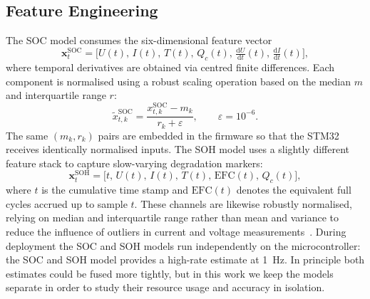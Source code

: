\documentclass[final,3p,times]{elsarticle}
\begin{document}
\subsection{Feature Engineering}
The SOC model consumes the six-dimensional feature vector
\begin{equation}
    \mathbf{x}^{\mathrm{SOC}}_t = \bigl[U(t),\, I(t),\, T(t),\, Q_c(t),\, \tfrac{\mathrm{d}U}{\mathrm{d}t}(t),\, \tfrac{\mathrm{d}I}{\mathrm{d}t}(t)\bigr],
\end{equation}
where temporal derivatives are obtained via centred finite differences. Each component is normalised using a robust scaling operation based on the median $m$ and interquartile range $r$: 
\begin{equation}
    \tilde{x}^{\mathrm{SOC}}_{t,k} = \frac{x^{\mathrm{SOC}}_{t,k} - m_k}{r_k + \varepsilon}, \qquad \varepsilon=10^{-6}.
\end{equation}
The same $(m_k,r_k)$ pairs are embedded in the firmware so that the STM32 receives identically normalised inputs. 
The SOH model uses a slightly different feature stack to capture slow-varying degradation markers:
\begin{equation}
    \mathbf{x}^{\mathrm{SOH}}_t = \bigl[ t,\, U(t),\, I(t),\, T(t),\, \mathrm{EFC}(t),\, Q_c(t) \bigr],
\end{equation}
where $t$ is the cumulative time stamp and $\mathrm{EFC}(t)$ denotes the equivalent full cycles accrued up to sample $t$. These channels are likewise robustly normalised, relying on median and interquartile range rather than mean and variance to reduce the influence of outliers in current and voltage measurements~\cite{huberRobustStatistics2009,pedregosaScikitlearnMachineLearning2012}. During deployment the SOC and SOH models run independently on the microcontroller: the SOC and SOH model provides a high-rate estimate at 1~Hz. In principle both estimates could be fused more tightly, but in this work we keep the models separate in order to study their resource usage and accuracy in isolation.
\end{document}
